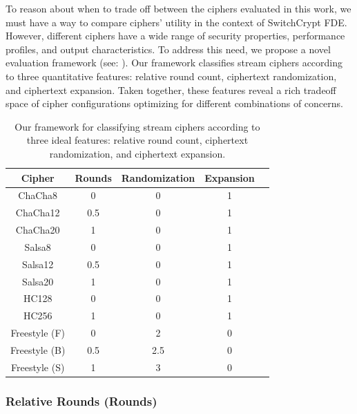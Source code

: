 To reason about when to trade off between the ciphers evaluated in this work, we
must have a way to compare ciphers' utility in the context of SwitchCrypt FDE.
However, different ciphers have a wide range of security properties, performance
profiles, and output characteristics. To address this need, we propose a novel
evaluation framework (see: ). Our framework classifies
stream ciphers according to three quantitative features: relative round count,
ciphertext randomization, and ciphertext expansion. Taken together, these
features reveal a rich tradeoff space of cipher configurations optimizing for
different combinations of concerns.

\begin{table}[ht]
   \centering
   \begin{tabular}{@{}ccccc@{}}
   \toprule
   \textbf{Cipher} & \textbf{Rounds} & \textbf{Randomization} &
   \textbf{Expansion} \\
   \midrule
   ChaCha8         & 0           & 0           & 1           \\
   ChaCha12        & 0.5         & 0           & 1           \\
   ChaCha20        & 1           & 0           & 1           \\
   Salsa8          & 0           & 0           & 1           \\
   Salsa12         & 0.5         & 0           & 1           \\
   Salsa20         & 1           & 0           & 1           \\
   HC128           & 0           & 0           & 1           \\
   HC256           & 1           & 0           & 1           \\
   Freestyle (F)   & 0           & 2           & 0           \\
   Freestyle (B)   & 0.5         & 2.5         & 0           \\
   Freestyle (S)   & 1           & 3           & 0           \\
\end{tabular}
   \caption{Our framework for classifying stream ciphers according to three
   ideal features: relative round count, ciphertext randomization, and
   ciphertext expansion.}
   \label{tbl:security-quant}
 \end{table}

\subsubsection{Relative Rounds (Rounds)}

